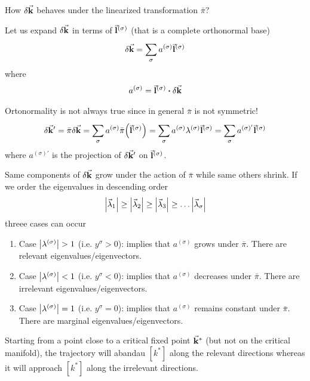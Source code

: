 \documentclass[../main/main.tex]{subfiles}
\begin{document}
How \( \delta \va{k} \) behaves under the linearized transformation \( \bar{\pi }  \)?

Let us expand \( \delta \va{k} \) in terms of \( \va{l}^{(\sigma )} \) (that is a complete orthonormal base)
\begin{equation}
  \delta \va{k} = \sum_{\sigma }^{} a^{(\sigma )} \va{l}^{(\sigma )}
\end{equation}
where
\begin{equation}
  a^{(\sigma )} = \va{l}^{(\sigma )} \vdot \delta \va{k}
\end{equation}
\begin{remark}
Ortonormality is not always true since in general \( \bar{\pi }  \) is not symmetric!
\begin{equation}
  \delta \va{k}' = \bar{\pi } \delta \va{k} = \sum_{\sigma }^{} a^{(\sigma )} \bar{\pi } \qty(\va{l}^{(\sigma )})
  = \sum_{\sigma }^{} a^{(\sigma )} \lambda ^{(\sigma )} \va{l}^{(\sigma )}
  = \sum_{\sigma }^{} a^{(\sigma )'} \va{l}^{(\sigma )}
\end{equation}
where \( a^{(\sigma )'} \) is the projection of \( \delta \va{k}' \) on \( \va{l}^{(\sigma )} \).
  \end{remark}
Same components of \( \delta \va{k} \) grow under the action of \( \bar{\pi }  \) while same others shrink.
If we order the eigenvalues in descending order
\begin{equation}
  \abs{\va{\lambda }_1} \ge \abs{\va{\lambda }_2} \ge \abs{\va{\lambda }_3} \ge \dots \abs{\va{\lambda }_{\sigma}}
\end{equation}
threee cases can occur
\begin{enumerate}
\item Case \( \abs{\lambda ^{(\sigma )}} > 1 \) (i.e. \( y^\sigma > 0\)): implies that \( a^{(\sigma )} \) grows under \( \bar{\pi }  \). There are relevant eigenvalues/eigenvectors.

\item Case \( \abs{\lambda ^{(\sigma )}} < 1 \) (i.e. \( y^\sigma < 0\)): implies that \( a^{(\sigma )} \) decreases under \( \bar{\pi }  \). There are irrelevant eigenvalues/eigenvectors.

\item Case \( \abs{\lambda ^{(\sigma )}} = 1 \) (i.e. \( y^\sigma =  0\)): implies that \( a^{(\sigma )} \) remains constant under \( \bar{\pi }  \). There are marginal eigenvalues/eigenvectors.
\end{enumerate}

Starting from a point close to a critical fixed point \( \va{k}^* \) (but not on the critical manifold), the trajectory will abandau \( [k^*] \) along the relevant directions whereas it will approach \( [k^*] \) along the irrelevant directions.
\end{document}
